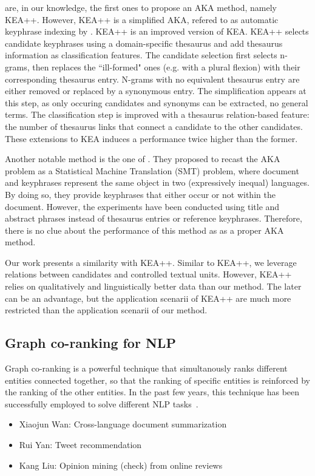      are, in our knowledge, the first ones
    to propose an AKA method, namely KEA++. However, KEA++ is a simplified AKA,
    refered to as automatic keyphrase indexing by
    . KEA++ is an improved version of KEA.
    KEA++ selects candidate keyphrases using a domain-specific thesaurus and add
    thesaurus information as classification features. The candidate selection
    first selects n-grams, then replaces the ``ill-formed" ones (e.g. with a
    plural flexion) with their corresponding thesaurus entry. N-grams with no
    equivalent thesaurus entry are either removed or replaced by a synonymous
    entry. The simplification appears at this step, as only occuring candidates
    and synonyms can be extracted, no general terms. The classification step is
    improved with a thesaurus relation-based feature: the number of thesaurus
    links that connect a candidate to the other candidates. These extensions to
    KEA induces a performance twice higher than the former.

    Another notable method is the one of . They
    proposed to recast the AKA problem as a Statistical Machine Translation
    (SMT) problem, where document and keyphrases represent the same object in
    two (expressively inequal) languages. By doing so, they provide keyphrases
    that either occur or not within the document. However, the experiments have
    been conducted using title and abstract phrases instead of thesaurus entries
    or reference keyphrases. Therefore, there is no clue about the performance
    of this method as as a proper AKA method.

    Our work presents a similarity with KEA++. Similar to KEA++, we leverage
    relations between candidates and controlled textual units. However, KEA++
    relies on qualitatively and linguistically better data than our method. The
    later can be an advantage, but the application scenarii of KEA++ are much
    more restricted than the application scenarii of our method.

  \subsection{Graph co-ranking for NLP}
  \label{subsec:graph_co_ranking_for_nlp}
    Graph co-ranking is a powerful technique that simultanously ranks
    different entities connected together, so that the ranking of specific
    entities is reinforced by the ranking of the other entities. In the past few
    years, this technique has been successfully employed to solve different NLP
    tasks~\cite{wan2011corankingsummarization,yan2012corankingtweetrecommendation,liu2014corankingopinionextraction}.

    \begin{itemize}
      \item{Xiaojun Wan: Cross-language document summarization}
      \item{Rui Yan: Tweet recommendation}
      \item{Kang Liu: Opinion mining (check) from online reviews}
    \end{itemize}

